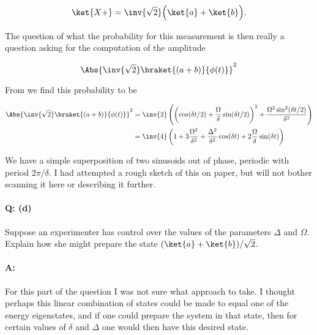 {\begin{equation}\label{eqn:qmIexamPractice2008Dec:2:120}
\ket{X+} = \inv{\sqrt{2}} \Bigl( \ket{a} + \ket{b} \Bigr).
\end{equation}

The question of what the probability for this measurement is then really a question asking for the computation of the amplitude

\begin{equation}\label{eqn:qmIexamPractice2008Dec:2:130}
\Abs{
\inv{\sqrt{2}}
\braket{
 (a + b)}{\phi(t)}}^2
\end{equation}

From  we find this probability to be

\begin{equation}\label{eqn:qmIexamPractice:710}
\begin{aligned}
\Abs{
\inv{\sqrt{2}}
\braket{
 (a + b)}{\phi(t)}}^2
&=
\inv{2} \left(
\left(\cos(\delta t/2) + \frac{\Omega}{\delta} \sin(\delta t/2)\right)^2
+ \frac{ \Omega^2 \sin^2(\delta t/2)}{\delta^2}
\right) \\
&=
\inv{4} \left( 1 + 3 \frac{\Omega^2}{\delta^2} + \frac{\Delta^2}{\delta^2} \cos (\delta t) + 2 \frac{ \Omega}{\delta} \sin(\delta t) \right)
\end{aligned}
\end{equation}

We have a simple superposition of two sinusoids out of phase, periodic with period \(2 \pi/\delta\).  I had attempted a rough sketch of this on paper, but will not bother scanning it here or describing it further.

\paragraph{Q: (d)}

Suppose an experimenter has control over the values of the parameters \(\Delta\) and \(\Omega\).  Explain how she might prepare the state \((\ket{a} + \ket{b})/\sqrt{2}\).

\paragraph{A:}

For this part of the question I was not sure what approach to take.  I thought perhaps this linear combination of states could be made to equal one of the energy eigenstates, and if one could prepare the system in that state, then for certain values of \(\delta\) and \(\Delta\) one would then have this desired state.

}
